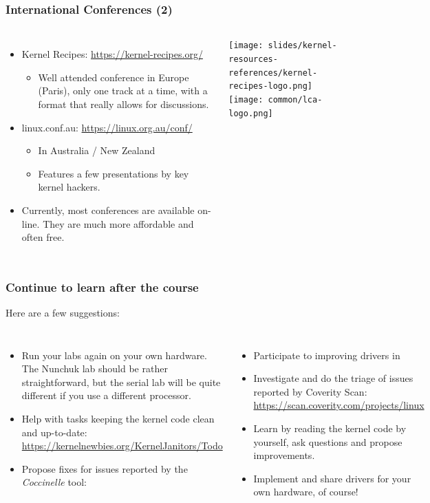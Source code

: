 \begin{frame}
  \frametitle{International Conferences (2)}
  \begin{columns}
    \begin{itemize}
      \item Kernel Recipes: \url{https://kernel-recipes.org/}
      \begin{itemize}
      \item Well attended conference in Europe (Paris), only one track
        at a time, with a format that really allows for discussions.
    \end{itemize}
    \item linux.conf.au: \url{https://linux.org.au/conf/}
      \begin{itemize}
      \item In Australia / New Zealand
      \item Features a few presentations by key kernel hackers.
      \end{itemize}
    \item Currently, most conferences are available on-line. They
	  are much more affordable and often free.
  \end{itemize}
     \texttt{[image: slides/kernel-resources-references/kernel-recipes-logo.png]}\\
     \vspace{1cm}
     \texttt{[image: common/lca-logo.png]}
  \end{columns}
\end{frame}

\begin{frame}
  \frametitle{Continue to learn after the course}
  Here are a few suggestions:
  \begin{columns}
  \begin{itemize}
  \item Run your labs again on your own hardware. The Nunchuk lab should
        be rather straightforward, but the serial lab will be quite different
	if you use a different processor.
  \item Help with tasks keeping the kernel code clean and up-to-date:\\
	\url{https://kernelnewbies.org/KernelJanitors/Todo}
  \item Propose fixes for issues reported by the {\em Coccinelle} tool:\\
  \end{itemize}
  \begin{itemize}
  \item Participate to improving drivers in 
  \item Investigate and do the triage of issues reported by Coverity Scan:
        \url{https://scan.coverity.com/projects/linux}
  \item Learn by reading the kernel code by yourself, ask questions and
	propose improvements.
  \item Implement and share drivers for your own hardware, of course!
  \end{itemize}
  \end{columns}
\end{frame}
